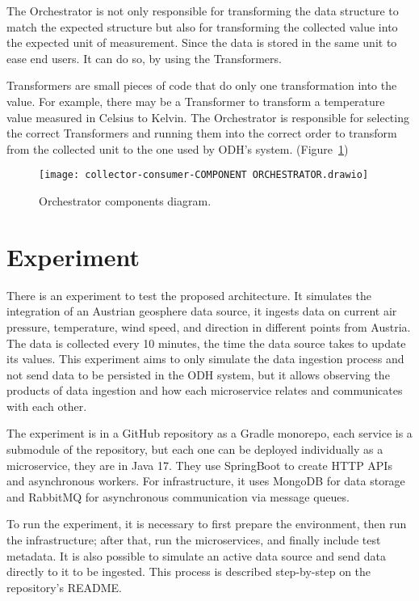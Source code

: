 The Orchestrator is not only responsible for transforming the data structure to match the expected structure but also for transforming the collected value into the expected unit of measurement. Since the data is stored in the same unit to ease end users. It can do so, by using the Transformers.

Transformers are small pieces of code that do only one transformation into the value. For example, there may be a Transformer to transform a temperature value measured in Celsius to Kelvin. The Orchestrator is responsible for selecting the correct Transformers and running them into the correct order to transform from the collected unit to the one used by ODH's system. (Figure~\ref{fig:orchestrator})

\begin{figure}
    \centering
    \texttt{[image: collector-consumer-COMPONENT ORCHESTRATOR.drawio]}
    \caption{Orchestrator components diagram.\label{fig:orchestrator}}
\end{figure}

\section{Experiment}
\label{sec:exp}

There is an experiment to test the proposed architecture. It simulates the integration of an Austrian geosphere data source, it ingests data on current air pressure, temperature, wind speed, and direction in different points from Austria. The data is collected every 10 minutes, the time the data source takes to update its values. This experiment aims to only simulate the data ingestion process and not send data to be persisted in the ODH system, but it allows observing the products of data ingestion and how each microservice relates and communicates with each other.

The experiment is in a GitHub repository as a Gradle monorepo, each service is a submodule of the repository, but each one can be deployed individually as a microservice, they are in Java 17. They use SpringBoot to create HTTP APIs and asynchronous workers. For infrastructure, it uses MongoDB for data storage and RabbitMQ for asynchronous communication via message queues.

To run the experiment, it is necessary to first prepare the environment, then run the infrastructure; after that, run the microservices, and finally include test metadata. It is also possible to simulate an active data source and send data directly to it to be ingested. This process is described step-by-step on the repository's README.

